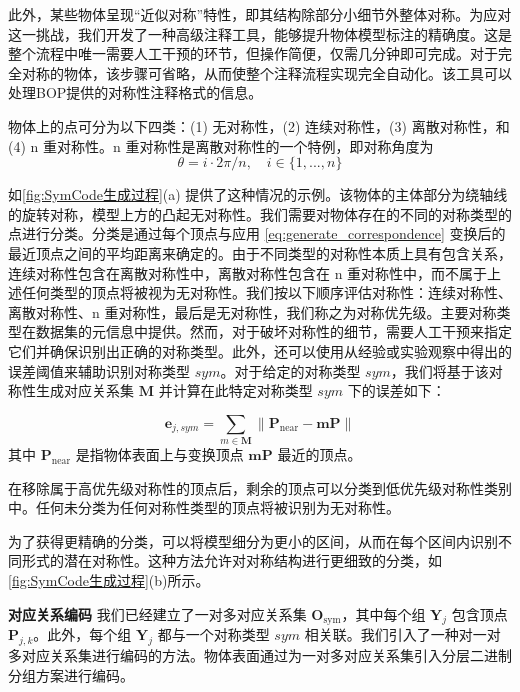 此外，某些物体呈现“近似对称”特性，即其结构除部分小细节外整体对称。为应对这一挑战，我们开发了一种高级注释工具，能够提升物体模型标注的精确度。这是整个流程中唯一需要人工干预的环节，但操作简便，仅需几分钟即可完成。对于完全对称的物体，该步骤可省略，从而使整个注释流程实现完全自动化。该工具可以处理BOP\cite{hodan2024bop}提供的对称性注释格式的信息。

物体上的点可分为以下四类：(1) 无对称性，(2) 连续对称性，(3) 离散对称性，和 (4) n 重对称性。n 重对称性是离散对称性的一个特例，即对称角度为
\begin{equation}
\theta=i \cdot 2\pi /n,\quad i \in \{1,...,n\}
\end{equation}

如\autoref{fig:SymCode生成过程}(a) 提供了这种情况的示例。该物体的主体部分为绕轴线的旋转对称，模型上方的凸起无对称性。我们需要对物体存在的不同的对称类型的点进行分类。分类是通过每个顶点与应用 \autoref{eq:generate_correspondence} 变换后的最近顶点之间的平均距离来确定的。由于不同类型的对称性本质上具有包含关系，连续对称性包含在离散对称性中，离散对称性包含在 n 重对称性中，而不属于上述任何类型的顶点将被视为无对称性。我们按以下顺序评估对称性：连续对称性、离散对称性、n 重对称性，最后是无对称性，我们称之为对称优先级。主要对称类型在数据集的元信息中提供。然而，对于破坏对称性的细节，需要人工干预来指定它们并确保识别出正确的对称类型。此外，还可以使用从经验或实验观察中得出的误差阈值来辅助识别对称类型 $sym$。对于给定的对称类型 $sym$，我们将基于该对称性生成对应关系集 $\mathbf{M}$ 并计算在此特定对称类型 $sym$ 下的误差如下：

\begin{equation}
\mathbf{e}_{j,sym} = \sum_{m\in\mathbf{M}}\left \|  \mathbf{P}_{\text{near}} - \mathbf{m}\mathbf{P} \right \| 
\end{equation}
其中 $\mathbf{P}_{\text{near}}$ 是指物体表面上与变换顶点 $\mathbf{m}\mathbf{P}$ 最近的顶点。

在移除属于高优先级对称性的顶点后，剩余的顶点可以分类到低优先级对称性类别中。任何未分类为任何对称性类型的顶点将被识别为无对称性。

为了获得更精确的分类，可以将模型细分为更小的区间，从而在每个区间内识别不同形式的潜在对称性。这种方法允许对对称结构进行更细致的分类，如\autoref{fig:SymCode生成过程}(b)所示。

\textbf{对应关系编码 } 我们已经建立了一对多对应关系集 $\mathbf{O}_\text{sym}$，其中每个组 $\mathbf{Y}_j$ 包含顶点 $\mathbf{P}_{j,k}$。此外，每个组 $\mathbf{Y}_j$ 都与一个对称类型 $sym$ 相关联。我们引入了一种对一对多对应关系集进行编码的方法。物体表面通过为一对多对应关系集引入分层二进制分组方案进行编码。

